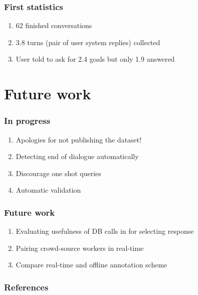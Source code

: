 \documentclass[10pt, compress,british,xcolor={svgnames,dvipsnames,x11names},trans]{beamer}
\def\sys#1{{\color{purple}System: \it #1}}
\def\usr#1{{\color{brown}User: \it #1}}
\def\api#1{{\color{blue}DB call: \it #1}}
\begin{document}
\begin{frame}\frametitle{First statistics}
    \begin{enumerate}
        \item 62 finished conversations
        \item 3.8 turns (pair of user system replies) collected
        \item User told to ask for 2.4 goals but only 1.9 answered 
    \end{enumerate}
\end{frame}


\section{Future work}

\begin{frame}\frametitle{In progress}
    \begin{enumerate}
        \item Apologies for not publishing the dataset!
        \item Detecting end of dialogue automatically
        \item Discourage one shot queries
        \item Automatic validation
    \end{enumerate}
\end{frame}

\begin{frame}\frametitle{Future work}
    \begin{enumerate}
        \item Evaluating usefulness of DB calls in for selecting response 
        \item Pairing crowd-source workers in real-time
        \item Compare real-time and offline annotation scheme
    \end{enumerate}
\end{frame}

\appendix

\begin{frame}[allowframebreaks]
        \frametitle{References}
        
        
\end{frame}
\end{document}
